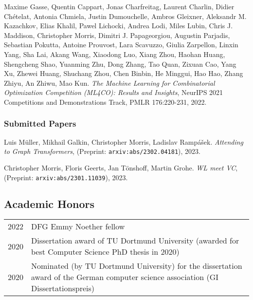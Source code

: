 \documentclass[10pt, a4paper, DIV=14, headings=small]{scrartcl}
\begin{document}
\begin{thebibliography}{15}
	Maxime Gasse, Quentin Cappart, Jonas Charfreitag, Laurent Charlin, Didier Chételat, Antonia Chmiela, Justin Dumouchelle, Ambros Gleixner, Aleksandr M. Kazachkov, Elias Khalil, Pawel Lichocki, Andrea Lodi, Miles Lubin, Chris J. Maddison, Christopher Morris, Dimitri J. Papageorgiou, Augustin Parjadis, Sebastian Pokutta, Antoine Prouvost, Lara Scavuzzo, Giulia Zarpellon, Linxin Yang, Sha Lai, Akang Wang, Xiaodong Luo, Xiang Zhou, Haohan Huang, Shengcheng Shao, Yuanming Zhu, Dong Zhang, Tao Quan, Zixuan Cao, Yang Xu, Zhewei Huang, Shuchang Zhou, Chen Binbin, He Minggui, Hao Hao, Zhang Zhiyu, An Zhiwu, Mao Kun.
	\emph{The Machine Learning for Combinatorial Optimization Competition (ML4CO): Results and Insights}, NeurIPS 2021 Competitions and Demonstrations Track, PMLR 176:220-231, 2022.

	\subsubsection*{Submitted Papers}

	Luis Müller, Mikhail Galkin, Christopher Morris, Ladislav Rampášek.
	\emph{Attending to Graph Transformers}, (Preprint: \texttt{arxiv:abs/2302.04181}), 2023.

	Christopher Morris, Floris Geerts, Jan Tönshoff, Martin Grohe.
	\emph{WL meet VC}, (Preprint: \texttt{arxiv:abs/2301.11039}), 2023.
\end{thebibliography}

\subsection*{Academic Honors}
 \tabulinesep=0.8mm
\begin{longtabu}{p{2.1cm}p{12.0cm}}
	2022 & DFG Emmy Noether fellow                                                                                                             \\
	2020 & Dissertation award of TU Dortmund University (awarded for best Computer Science PhD thesis in 2020)                                 \\
	2020 & Nominated (by TU Dortmund University) for the dissertation award of the German computer science association (GI Dissertationspreis) \\
\end{longtabu}
\end{document}
